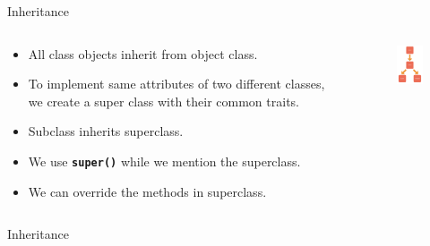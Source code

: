         \begin{frame}{Inheritance}
            \begin{columns}
                \begin{column}{0.40\textwidth}
                    \begin{itemize}
                        \item All class objects inherit from object class.
                        \item To implement same attributes of two different classes, we create a super class with their common traits.
                        \item Subclass inherits superclass.
                        \item We use \texttt{\textbf{super()}} while we mention the superclass.
                        \item We can override the methods in superclass.
                    \end{itemize}
                \end{column}
                \begin{column}{0.60\textwidth}
                    \begin{figure}[H]
                        \centering
                        \includegraphics[width=30mm]{code_examples/inheritance.png}
                    \end{figure}
                \end{column}
            \end{columns}
        \end{frame}

        \begin{frame}{Inheritance}
            \small \inputminted[frame=single,framesep=1pt, lastline = 20]{python3}{code_examples/inheritance.py}
        \end{frame}

